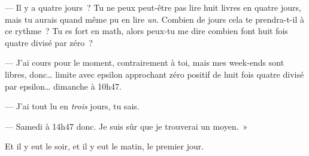 --- Il y a quatre jours~? Tu ne peux peut-être pas lire huit livres en quatre jours, mais tu aurais quand même pu en lire \emph{un}. Combien de jours cela te prendra-t-il à ce rythme~? Tu es fort en math, alors peux-tu me dire combien font huit fois quatre divisé par zéro~?

--- J'ai cours pour le moment, contrairement à toi, mais mes week-ends sont libres, donc… limite avec epsilon approchant zéro positif de huit fois quatre divisé par epsilon… dimanche à 10h47.

--- J'ai tout lu en \emph{trois} jours, tu sais.

--- Samedi à 14h47 donc. Je suis sûr que je trouverai un moyen.~»

Et il y eut le soir, et il y eut le matin, le premier jour.

